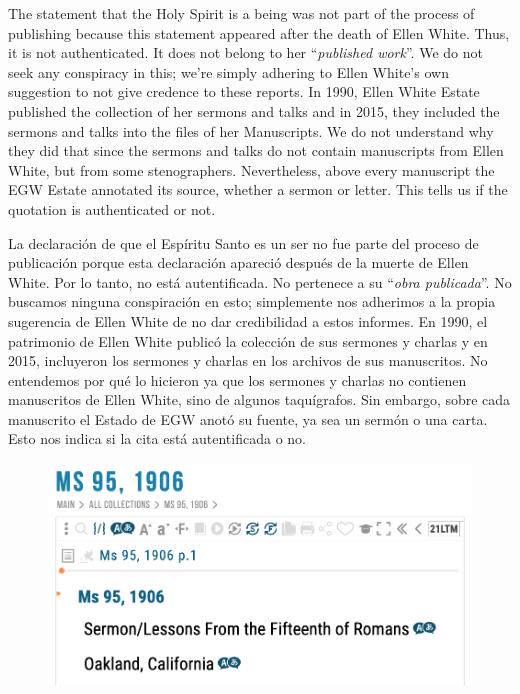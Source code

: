 The statement that the Holy Spirit is a being was not part of the process of publishing because this statement appeared after the death of Ellen White. Thus, it is not authenticated. It does not belong to her “\textit{published work}”. We do not seek any conspiracy in this; we’re simply adhering to Ellen White’s own suggestion to not give credence to these reports. In 1990, Ellen White Estate published the collection of her sermons and talks and in 2015, they included the sermons and talks into the files of her Manuscripts. We do not understand why they did that since the sermons and talks do not contain manuscripts from Ellen White, but from some stenographers. Nevertheless, above every manuscript the EGW Estate annotated its source, whether a sermon or letter. This tells us if the quotation is authenticated or not.


La declaración de que el Espíritu Santo es un ser no fue parte del proceso de publicación porque esta declaración apareció después de la muerte de Ellen White. Por lo tanto, no está autentificada. No pertenece a su “\textit{obra publicada}”. No buscamos ninguna conspiración en esto; simplemente nos adherimos a la propia sugerencia de Ellen White de no dar credibilidad a estos informes. En 1990, el patrimonio de Ellen White publicó la colección de sus sermones y charlas y en 2015, incluyeron los sermones y charlas en los archivos de sus manuscritos. No entendemos por qué lo hicieron ya que los sermones y charlas no contienen manuscritos de Ellen White, sino de algunos taquígrafos. Sin embargo, sobre cada manuscrito el Estado de EGW anotó su fuente, ya sea un sermón o una carta. Esto nos indica si la cita está autentificada o no.


\begin{figure}
    \centering
    \includegraphics[width=1\linewidth]{images/sermons-and-talks.png}
    \label{fig:enter-label}
\end{figure}


